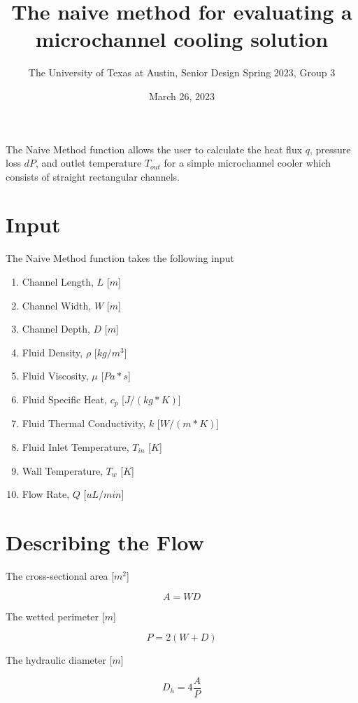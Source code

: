 \documentclass{article}
\title{The naive method for evaluating a microchannel cooling solution}
\author{The University of Texas at Austin, Senior Design Spring 2023, Group 3}
\date{March 26, 2023}
\begin{document}
\maketitle

The Naive Method function allows the user to calculate the heat flux $q$, pressure loss $dP$, and outlet temperature $T_{out}$ for a simple microchannel cooler which consists of straight rectangular channels.

\section{Input}

The Naive Method function takes the following input

\begin{enumerate}

\item Channel Length, $L$ [$m$]
\item Channel Width, $W$ [$m$]
\item Channel Depth, $D$ [$m$]
\item Fluid Density, $\rho$ [$kg/m^3$]
\item Fluid Viscosity, $\mu$ [$Pa*s$]
\item Fluid Specific Heat, $c_p$ [$J/(kg*K)$]
\item Fluid Thermal Conductivity, $k$ [$W/(m*K)$]
\item Fluid Inlet Temperature, $T_{in}$ [$K$]
\item Wall Temperature, $T_w$ [$K$]
\item Flow Rate, $Q$ [$uL/min$]

\end{enumerate}

\section{Describing the Flow}

The cross-sectional area [$m^2$]

\begin{equation}
	A = WD
\end{equation}

The wetted perimeter [$m$]

\begin{equation}
	P = 2(W+D)
\end{equation}

The hydraulic diameter [$m$]

\begin{equation}
	D_h = 4 \frac{A}{P}
\end{equation}
\end{document}
